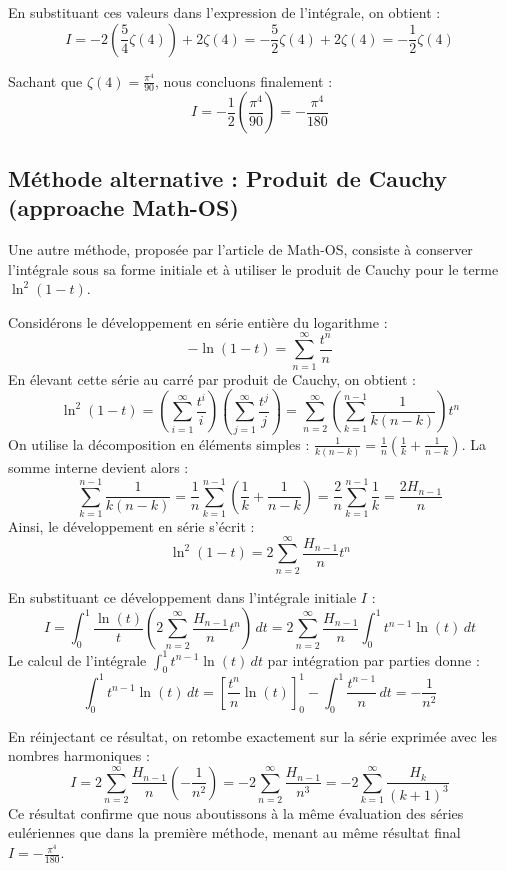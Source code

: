 \documentclass{article}
\begin{document}
En substituant ces valeurs dans l'expression de l'intégrale, on obtient :
\[
I = -2 \left( \frac{5}{4} \zeta(4) \right) + 2 \zeta(4) = -\frac{5}{2} \zeta(4) + 2 \zeta(4) = - \frac{1}{2} \zeta(4)
\]

Sachant que $\zeta(4) = \frac{\pi^4}{90}$, nous concluons finalement :
\[
I = - \frac{1}{2} \left( \frac{\pi^4}{90} \right) = - \frac{\pi^4}{180}
\]

\vspace{0.5cm}
\subsection*{Méthode alternative : Produit de Cauchy (approache Math-OS)}

Une autre méthode, proposée par l'article de Math-OS, consiste à conserver l'intégrale sous sa forme initiale et à utiliser le produit de Cauchy pour le terme $\ln^2(1-t)$.

Considérons le développement en série entière du logarithme :
\[
-\ln(1-t) = \sum_{n=1}^\infty \frac{t^n}{n}
\]
En élevant cette série au carré par produit de Cauchy, on obtient :
\[
\ln^2(1-t) = \left( \sum_{i=1}^\infty \frac{t^i}{i} \right) \left( \sum_{j=1}^\infty \frac{t^j}{j} \right) = \sum_{n=2}^\infty \left( \sum_{k=1}^{n-1} \frac{1}{k(n-k)} \right) t^n
\]
On utilise la décomposition en éléments simples : $\frac{1}{k(n-k)} = \frac{1}{n} \left( \frac{1}{k} + \frac{1}{n-k} \right)$. 
La somme interne devient alors :
\[
\sum_{k=1}^{n-1} \frac{1}{k(n-k)} = \frac{1}{n} \sum_{k=1}^{n-1} \left( \frac{1}{k} + \frac{1}{n-k} \right) = \frac{2}{n} \sum_{k=1}^{n-1} \frac{1}{k} = \frac{2 H_{n-1}}{n}
\]
Ainsi, le développement en série s'écrit :
\[
\ln^2(1-t) = 2 \sum_{n=2}^\infty \frac{H_{n-1}}{n} t^n
\]

En substituant ce développement dans l'intégrale initiale $I$ :
\[
I = \int_0^1 \frac{\ln(t)}{t} \left( 2 \sum_{n=2}^\infty \frac{H_{n-1}}{n} t^n \right) \, dt = 2 \sum_{n=2}^\infty \frac{H_{n-1}}{n} \int_0^1 t^{n-1} \ln(t) \, dt
\]
Le calcul de l'intégrale $\int_0^1 t^{n-1} \ln(t) \, dt$ par intégration par parties donne :
\[
\int_0^1 t^{n-1} \ln(t) \, dt = \left[ \frac{t^n}{n} \ln(t) \right]_0^1 - \int_0^1 \frac{t^{n-1}}{n} \, dt = - \frac{1}{n^2}
\]

En réinjectant ce résultat, on retombe exactement sur la série exprimée avec les nombres harmoniques :
\[
I = 2 \sum_{n=2}^\infty \frac{H_{n-1}}{n} \left( - \frac{1}{n^2} \right) = -2 \sum_{n=2}^\infty \frac{H_{n-1}}{n^3} = -2 \sum_{k=1}^\infty \frac{H_k}{(k+1)^3}
\]
Ce résultat confirme que nous aboutissons à la même évaluation des séries eulériennes que dans la première méthode, menant au même résultat final $I = -\frac{\pi^4}{180}$.
\end{document}
